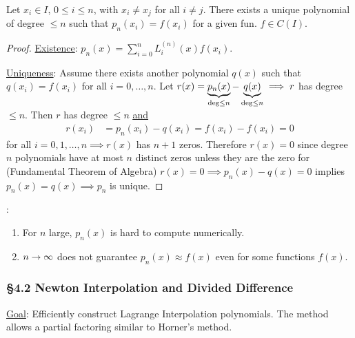 \documentclass[]{article}
\begin{document}
\begin{theorem}
	Let $x_i\in I$, $0\leq i\leq n$, with $x_i\neq x_j$ for all $i\neq j$.
	There exists a unique polynomial of degree $\leq n$ such that $p_n(x_i)=f(x_i)$ for a given fun. $f\in C(I)$.
\end{theorem}
\begin{proof}
	\ul{Existence}: $p_n(x) = \sum_{i=0}^n L_i^{(n)}(x)f(x_i)$.

	\ul{Uniqueness}: Assume there exists another polynomial $q(x)$ such that $q(x_i) = f(x_i)$ for all $i=0,\dots,n$.
	Let $r(x) = \ub{\text{deg}\leq n}{p_n(x)} - \ub{\text{deg}\leq n}{q(x)} \implies r$ has degree $\leq n$.
	Then $r$ has degree $\leq n$ \ul{\ul{and}}
	\begin{align*}
		r(x_i) &= p_n(x_i) - q(x_i)
			   = f(x_i) - f(x_i)
			   = 0
	\end{align*}
	for all $i=0,1,\dots,n \implies r(x)$ has $n+1$ zeros.
	Therefore $r(x)=0$ since degree $n$ polynomials have at most $n$ distinct zeros unless they are the zero for (Fundamental Theorem of Algebra)
	$r(x) = 0 \implies p_n(x) - q(x) = 0$ implies $p_n(x) = q(x) \implies p_n$ is unique.
\end{proof}
\begin{note}:
	\begin{enumerate}
		\item For $n$ large, $p_n(x)$ is hard to compute numerically.
		\item $n\ra\infty$ does not guarantee $p_n(x)\approx f(x)$ even for some  functions $f(x)$.
	\end{enumerate}
\end{note}

\subsubsection*{\S4.2 Newton Interpolation and Divided Difference}

\ul{Goal}: Efficiently construct Lagrange Interpolation polynomials.
The method allows a partial factoring similar to Horner's method.
\end{document}
